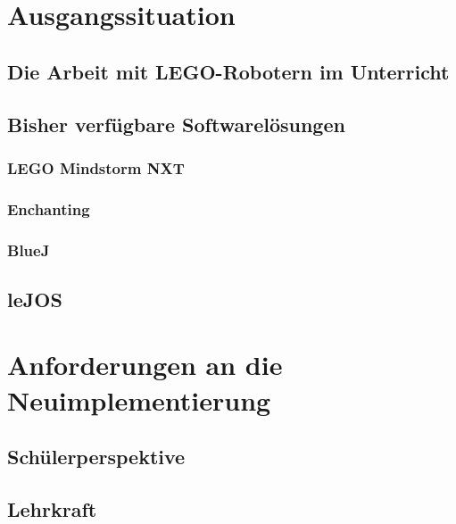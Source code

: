\documentclass[paper=a4, pagesize, DIV=calc, BCOR=12.5mm, twoside=on, onecolumn=on, open = any, titlepage =on, parskip =half-, headsepline = on, footsepline = on, chapterprefix = on, appendixprefix = off, fontsize = 12pt, numbers = noenddot, abstract = on]{scrbook}
\numberwithin{equation}{chapter}
\theoremstyle{definition}
\theoremstyle{plain}
\theoremstyle{plain}
\theoremstyle{remark}
\theoremstyle{plain}
\theoremstyle{plain}
\begin{document}
\chapter{Ausgangssituation}
\onehalfspacing
\section{Die Arbeit mit LEGO-Robotern im Unterricht}


\section{Bisher verfügbare Softwarelösungen}

\subsection{LEGO Mindstorm NXT}

\subsection{Enchanting}

\subsection{BlueJ}

\par \singlespacing
\section{leJOS}
\onehalfspacing



\par \singlespacing
\chapter{Anforderungen an die Neuimplementierung}
\onehalfspacing




\section{Schülerperspektive}
\onehalfspacing

\par \singlespacing
\section{Lehrkraft}
\label{sec:lehrkraft}
\par \onehalfspacing
\end{document}
